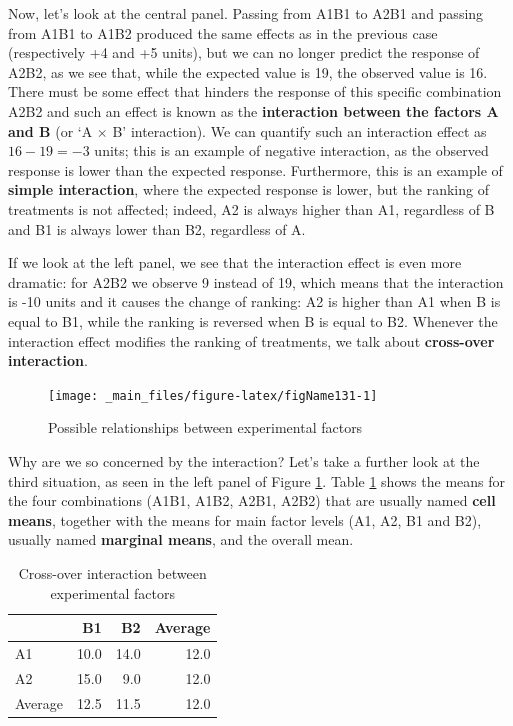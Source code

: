 \documentclass[a4paper,12pt,oneside]{book}
\begin{document}
Now, let's look at the central panel. Passing from A1B1 to A2B1 and passing from A1B1 to A1B2 produced the same effects as in the previous case (respectively +4 and +5 units), but we can no longer predict the response of A2B2, as we see that, while the expected value is 19, the observed value is 16. There must be some effect that hinders the response of this specific combination A2B2 and such an effect is known as the \textbf{interaction between the factors A and B} (or `A \(\times\) B' interaction). We can quantify such an interaction effect as \(16 - 19 = -3\) units; this is an example of negative interaction, as the observed response is lower than the expected response. Furthermore, this is an example of \textbf{simple interaction}, where the expected response is lower, but the ranking of treatments is not affected; indeed, A2 is always higher than A1, regardless of B and B1 is always lower than B2, regardless of A.

If we look at the left panel, we see that the interaction effect is even more dramatic: for A2B2 we observe 9 instead of 19, which means that the interaction is -10 units and it causes the change of ranking: A2 is higher than A1 when B is equal to B1, while the ranking is reversed when B is equal to B2. Whenever the interaction effect modifies the ranking of treatments, we talk about \textbf{cross-over interaction}.

\begin{figure}

{\centering \texttt{[image: \_main\_files/figure-latex/figName131-1]} 

}

\caption{Possible relationships between experimental factors}\label{fig:figName131}
\end{figure}

Why are we so concerned by the interaction? Let's take a further look at the third situation, as seen in the left panel of Figure \ref{fig:figName131}. Table \ref{tab:tabName131} shows the means for the four combinations (A1B1, A1B2, A2B1, A2B2) that are usually named \textbf{cell means}, together with the means for main factor levels (A1, A2, B1 and B2), usually named \textbf{marginal means}, and the overall mean.

\begin{table}

\caption{\label{tab:tabName131}Cross-over interaction between experimental factors}
\centering
\begin{tabular}[t]{lrrr}
\toprule
  & B1 & B2 & Average\\
\midrule
A1 & 10.0 & 14.0 & 12.0\\
A2 & 15.0 & 9.0 & 12.0\\
Average & 12.5 & 11.5 & 12.0\\
\bottomrule
\end{tabular}
\end{table}
\end{document}
